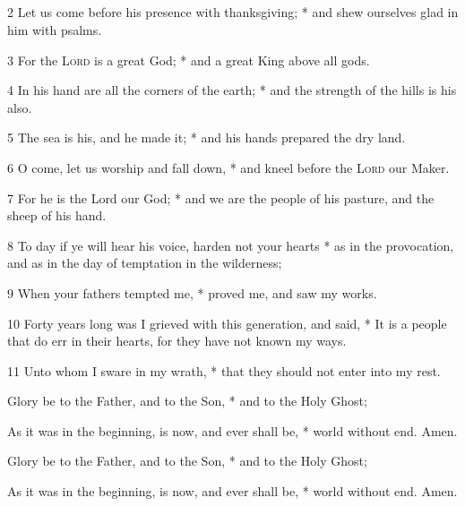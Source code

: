 \subsection{}

2 Let us come before his presence with thanksgiving; * and shew ourselves glad in him with psalms.

3 For the {\scshape Lord} is a great God; * and a great King above all gods.

4 In his hand are all the corners of the earth; * and the strength of the hills is his also.

5 The sea is his, and he made it; * and his hands prepared the dry land.

6 O come, let us worship and fall down, * and kneel before the {\scshape Lord} our Maker.

7 For he is the Lord our God; * and we are the people of his pasture, and the sheep of his hand.

8 To day if ye will hear his voice, harden not your hearts * as in the provocation, and as in the day of temptation in the wilderness;

9 When your fathers tempted me, * proved me, and saw my works.

10 Forty years long was I grieved with this generation, and said, * It is a people that do err in their hearts, for they have not known my ways.

11 Unto whom I sware in my wrath, * that they should not enter into my rest.

Glory be to the Father, and to the Son, * and to the Holy Ghost;

As it was in the beginning, is now, and ever shall be, * world without end. Amen.

\bigskip
{}
Glory be to the Father, and to the Son, * and to the Holy Ghost;

As it was in the beginning, is now, and ever shall be, * world without end. Amen.

\bigskip
{}

